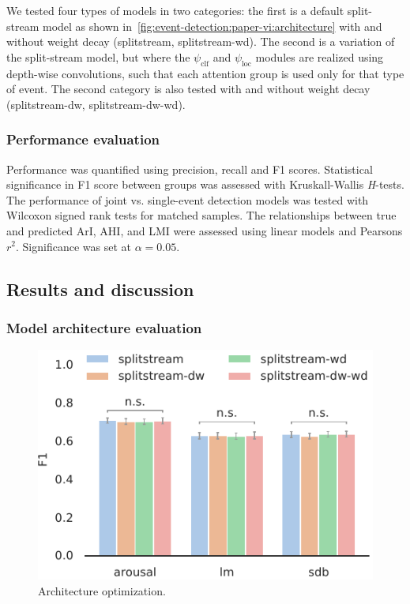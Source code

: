 We tested four types of models in two categories: the first is a default split-stream model as shown in~\cref{fig:event-detection:paper-vi:architecture} with and without weight decay (splitstream, splitstream-wd).
The second is a variation of the split-stream model, but where the \(\psi_\text{clf}\) and \(\psi_\text{loc}\) modules are realized using depth-wise convolutions, such that each attention group is used only for that type of event.
The second category is also tested with and without weight decay (splitstream-dw, splitstream-dw-wd).


\subsubsection{Performance evaluation}
Performance was quantified using precision, recall and F1 scores.
Statistical significance in F1 score between groups was assessed with Kruskall-Wallis \textit{H}-tests.
The performance of joint vs. single-event detection models was tested with Wilcoxon signed rank tests for matched samples.
The relationships between true and predicted \ac{ArI}, \ac{AHI}, and \ac{LMI} were assessed using linear models and Pearsons \(r^2\).
Significance was set at \(\alpha=0.05\).

\subsection{Results and discussion}
\subsubsection{Model architecture evaluation}

\begin{figure}[tb]
    \centering
    \includegraphics[width=0.75\linewidth]{figures/paper-vi/model_types (2).pdf}
    \caption[Architecture optimization]{Architecture optimization.}\label{fig:my_label}
\end{figure}

